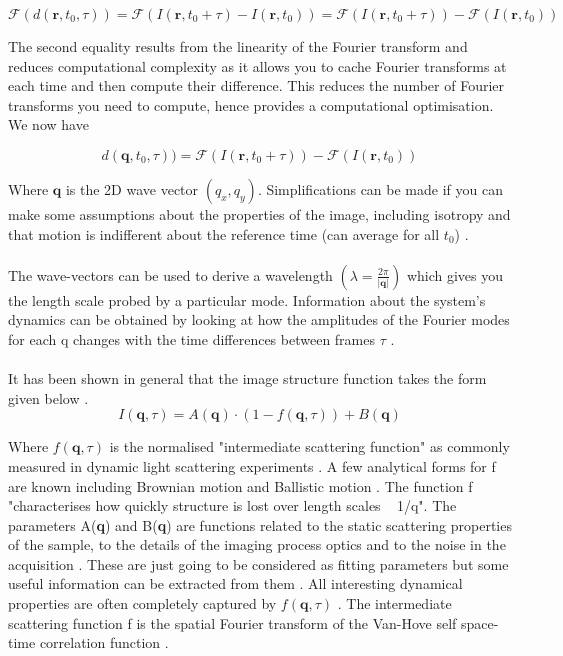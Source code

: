 \documentclass[11pt]{article}
\begin{document}
\begin{equation}
    \mathscr{F} (d(\textbf{r}, t_0, \tau) ) = \mathscr{F} (I(\mathbf{r}, t_0 + \tau) - I(\mathbf{r}, t_0)) = \mathscr{F}(I(\mathbf{r}, t_0 + \tau)) - \mathscr{F}(I(\mathbf{r}, t_0))
\end{equation}

The second equality results from the linearity of the Fourier transform and reduces computational complexity as it allows you to cache Fourier transforms at each time and then compute their difference.
This reduces the number of Fourier transforms you need to compute, hence provides a computational optimisation.\cite{ddm2}
We now have

\begin{equation}
    d(\textbf{q}, t_0, \tau) ) = \mathscr{F}(I(\mathbf{r}, t_0 + \tau)) - \mathscr{F}(I(\mathbf{r}, t_0))
\end{equation}

Where $\textbf{q}$ is the 2D wave vector $(q_x, q_y)$.
Simplifications can be made if you can make some assumptions about the properties of the image, including isotropy and that motion is indifferent about the reference time (can average for all $t_0$) \cite{ddm1}.
\\\\
The wave-vectors can be used to derive a wavelength $(\lambda = \frac{2\pi}{|\textbf{q}|})$ which gives you the length scale probed by a particular mode.
Information about the system's dynamics can be obtained by looking at how the amplitudes of the Fourier modes for each q changes with the time differences between frames $\tau$ \cite{ddm2}.
\\\\

It has been shown in general that the image structure function takes the form given below \cite{ddm1}.
\begin{equation}
	I(\textbf{q}, \tau) = A(\textbf{q}) \cdot (1 - f(\textbf{q}, \tau)) + B(\textbf{q})
\end{equation}

Where $f(\textbf{q}, \tau)$ is the normalised "intermediate scattering function" as commonly measured in dynamic light scattering experiments \cite{DLSPecora}. A few analytical forms for f are known including Brownian motion and Ballistic motion \cite{DLSPecora}. The function f "characterises how quickly structure is lost over length scales ~ 1/q"\cite{ddm1}. The parameters A(\textbf{q}) and B(\textbf{q}) are functions related to the static scattering properties of the sample, to the details of the imaging process optics and to the noise in the acquisition \cite{ddm1}. These are just going to be considered as fitting parameters but some useful information can be extracted from them \cite{ddm1}. All interesting dynamical properties are often completely captured by $f(\textbf{q}, \tau)$ \cite{ddm1}. The intermediate scattering function f is the spatial Fourier transform of the Van-Hove self space-time correlation function \cite{DLSPecora}.
\end{document}
